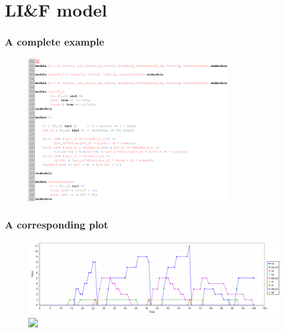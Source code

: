 \section{LI\&F model}


\begin{frame}
  \frametitle{A complete example}

  \begin{figure}
    \includegraphics[width=0.8\textwidth]{pic/simple_serie_complex.png}
  \end{figure}

\end{frame}

\begin{frame}
  \frametitle{A corresponding plot}

  \begin{figure}
    \includegraphics[width=\textwidth]{pic/simple_serie_complex_plot.png}

    \includegraphics<2>[width=\textwidth]{pic/simple_serie_complex_explorat.png}
  \end{figure}

\end{frame}